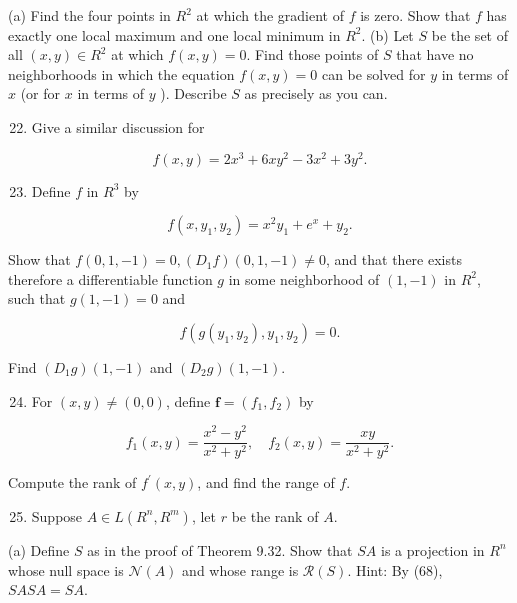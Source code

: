 \documentclass[10pt]{article}
\begin{document}
(a) Find the four points in $R^{2}$ at which the gradient of $f$ is zero. Show that $f$ has exactly one local maximum and one local minimum in $R^{2}$. (b) Let $S$ be the set of all $(x, y) \in R^{2}$ at which $f(x, y)=0$. Find those points of $S$ that have no neighborhoods in which the equation $f(x, y)=0$ can be solved for $y$ in terms of $x$ (or for $x$ in terms of $y$ ). Describe $S$ as precisely as you can.

\begin{enumerate}
  \setcounter{enumi}{21}
  \item Give a similar discussion for
\end{enumerate}

$$
f(x, y)=2 x^{3}+6 x y^{2}-3 x^{2}+3 y^{2} .
$$

\begin{enumerate}
  \setcounter{enumi}{22}
  \item Define $f$ in $R^{3}$ by
\end{enumerate}

$$
f\left(x, y_{1}, y_{2}\right)=x^{2} y_{1}+e^{x}+y_{2} .
$$

Show that $f(0,1,-1)=0,\left(D_{1} f\right)(0,1,-1) \neq 0$, and that there exists therefore a differentiable function $g$ in some neighborhood of $(1,-1)$ in $R^{2}$, such that $g(1,-1)=0$ and

$$
f\left(g\left(y_{1}, y_{2}\right), y_{1}, y_{2}\right)=0 .
$$

Find $\left(D_{1} g\right)(1,-1)$ and $\left(D_{2} g\right)(1,-1)$.

\begin{enumerate}
  \setcounter{enumi}{23}
  \item For $(x, y) \neq(0,0)$, define $\mathbf{f}=\left(f_{1}, f_{2}\right)$ by
\end{enumerate}

$$
f_{1}(x, y)=\frac{x^{2}-y^{2}}{x^{2}+y^{2}}, \quad f_{2}(x, y)=\frac{x y}{x^{2}+y^{2}} .
$$

Compute the rank of $f^{\prime}(x, y)$, and find the range of $f$.

\begin{enumerate}
  \setcounter{enumi}{24}
  \item Suppose $A \in L\left(R^{n}, R^{m}\right)$, let $r$ be the rank of $A$.
\end{enumerate}

(a) Define $S$ as in the proof of Theorem 9.32. Show that $S A$ is a projection in $R^{n}$ whose null space is $\mathscr{N}(A)$ and whose range is $\mathscr{R}(S)$. Hint: By (68), $S A S A=S A$.
\end{document}
